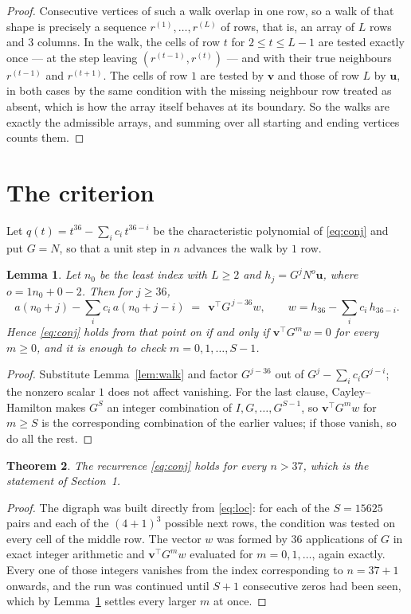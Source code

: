 \documentclass[11pt,a4paper]{article}
\theoremstyle{plain}
\newtheorem{theorem}{Theorem}
\newtheorem{lemma}[theorem]{Lemma}
\theoremstyle{definition}
\begin{document}
\begin{proof}
Consecutive vertices of such a walk overlap in one row, so a walk of that shape is
precisely a sequence $r^{(1)},\dots,r^{(L)}$ of rows, that is, an array of $L$ rows
and $3$ columns. In the walk, the cells of row $t$ for $2\le t\le L-1$ are tested
exactly once --- at the step leaving $(r^{(t-1)},r^{(t)})$ --- and with their true
neighbours $r^{(t-1)}$ and $r^{(t+1)}$. The cells of row $1$ are tested by
$\mathbf{v}$ and those of row $L$ by $\mathbf{u}$, in both cases by the same condition
with the missing neighbour row treated as absent, which is how the array itself behaves at
its boundary. So the walks are exactly the admissible arrays, and summing over all starting
and ending vertices counts them.
\end{proof}

\section{The criterion}

Let $q(t)=t^{36}-\sum_i c_i\,t^{36-i}$ be the characteristic polynomial of
\eqref{eq:conj} and put $G=N$, so that a unit step in $n$ advances the walk by
$1$ row.

\begin{lemma}\label{lem:crit}
Let $n_0$ be the least index with $L\ge2$ and $h_j=G^{j}N^{o}\mathbf{u}$, where
$o=1n_0+0-2$. Then for $j\ge36$,
\[
a(n_0+j)-\sum_i c_i\,a(n_0+j-i)\;=\;\,\mathbf{v}^{\!\top}G^{\,j-36}w,
\qquad w=h_{36}-\sum_i c_i\,h_{36-i} .
\]
Hence \eqref{eq:conj} holds from that point on if and only if
$\mathbf{v}^{\!\top}G^{m}w=0$ for every $m\ge0$, and it is enough to check
$m=0,1,\dots,S-1$.
\end{lemma}

\begin{proof}
Substitute Lemma~\ref{lem:walk} and factor $G^{j-36}$ out of
$G^{j}-\sum_ic_iG^{j-i}$; the nonzero scalar $1$ does not affect
vanishing. For the last clause, Cayley--Hamilton makes $G^{S}$ an integer combination of
$I,G,\dots,G^{S-1}$, so $\mathbf{v}^{\!\top}G^{m}w$ for $m\ge S$ is the corresponding
combination of the earlier values; if those vanish, so do all the rest.
\end{proof}

\begin{theorem}
The recurrence \eqref{eq:conj} holds for every $n>37$, which is the statement of
Section~1.
\end{theorem}

\begin{proof}
The digraph was built directly from \eqref{eq:loc}: for each of the $S=15625$ pairs and each
of the $(4+1)^{3}$ possible next rows, the condition was tested on every cell of
the middle row. The vector $w$ was formed by $36$ applications of $G$ in exact integer
arithmetic and $\mathbf{v}^{\!\top}G^{m}w$ evaluated for $m=0,1,\dots$, again exactly.
Every one of those integers vanishes from the index corresponding to $n=37+1$ onwards,
and the run was continued until $S+1$ consecutive zeros had been seen, which by
Lemma~\ref{lem:crit} settles every larger $m$ at once.
\end{proof}
\end{document}
